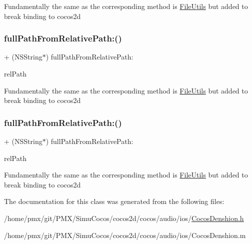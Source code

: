 Fundamentally the same as the corresponding method is \hyperlink{classFileUtils}{File\+Utils} but added to break binding to cocos2d \mbox{\label{interfaceCDUtilities_a1b7fe6a2b7074ed0e031ec420e172862}} 
\subsubsection{\texorpdfstring{full\+Path\+From\+Relative\+Path\+:()}{fullPathFromRelativePath:()}\hspace{0.1cm}{\footnotesize\ttfamily [3/4]}}
{\footnotesize\ttfamily + (N\+S\+String$\ast$) full\+Path\+From\+Relative\+Path\+: \begin{DoxyParamCaption}\item[{(N\+S\+String $\ast$)}]{rel\+Path }\end{DoxyParamCaption}}

Fundamentally the same as the corresponding method is \hyperlink{classFileUtils}{File\+Utils} but added to break binding to cocos2d \mbox{\label{interfaceCDUtilities_a1b7fe6a2b7074ed0e031ec420e172862}} 
\subsubsection{\texorpdfstring{full\+Path\+From\+Relative\+Path\+:()}{fullPathFromRelativePath:()}\hspace{0.1cm}{\footnotesize\ttfamily [4/4]}}
{\footnotesize\ttfamily + (N\+S\+String$\ast$) full\+Path\+From\+Relative\+Path\+: \begin{DoxyParamCaption}\item[{(N\+S\+String $\ast$)}]{rel\+Path }\end{DoxyParamCaption}}

Fundamentally the same as the corresponding method is \hyperlink{classFileUtils}{File\+Utils} but added to break binding to cocos2d 

The documentation for this class was generated from the following files\+:\begin{DoxyCompactItemize}
\item 
/home/pmx/git/\+P\+M\+X/\+Simu\+Cocos/cocos2d/cocos/audio/ios/\hyperlink{cocos2d_2cocos_2audio_2ios_2CocosDenshion_8h}{Cocos\+Denshion.\+h}\item 
/home/pmx/git/\+P\+M\+X/\+Simu\+Cocos/cocos2d/cocos/audio/ios/Cocos\+Denshion.\+m\end{DoxyCompactItemize}
